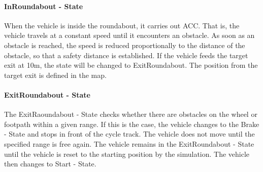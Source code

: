 \documentclass[11pt,oneside,openright]{mpreport}
\begin{document}
\paragraph{InRoundabout - State}
When the vehicle is inside the roundabout, it carries out \ac {ACC}. That is, the vehicle travels at a constant speed until it encounters an obstacle. 
As soon as an obstacle is reached, the speed is reduced proportionally to the distance of the obstacle, so that a safety distance is established.
If the vehicle feeds the target exit at 10m, the state will be changed to ExitRoundabout. The position from the target exit is defined in the map.




\paragraph{ExitRoundabout - State}

The ExitRaoundabout - State checks whether there are obstacles on the wheel or footpath within a given range.
If this is the case, the vehicle changes to the Brake - State and stops in front of the cycle track. The vehicle does not move until the specified range is free again.
The vehicle remains in the ExitRoundabout - State until the vehicle is reset to the starting position by the simulation.
The vehicle then changes to Start - State.
\end{document}
